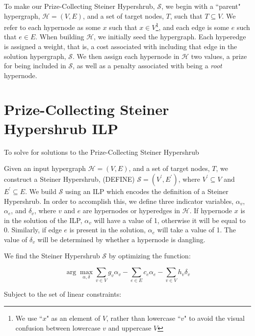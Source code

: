 \documentclass[12pt,twoside]{reedthesis}
\theoremstyle{definition}
\newcommand{\argmax}{\arg\!\max}
\begin{document}
To make our Prize-Collecting Steiner Hypershrub, $\mathcal{S}$, we begin with a ``parent" hypergraph, $\mathcal{H} = (V,E)$, and a set of target nodes, $T$, such that $T \subseteq V$.  We refer to each hypernode as some $x$ such that $x \in V$\footnote{We use ``$x$" as an element of $V$, rather than lowercase ``$v$" to avoid the visual confusion between lowercase $v$ and uppercase $V$}, and each edge is some $e$ such that $e \in E$.  When building $\mathcal{H}$, we initially seed the hypergraph.  Each hyperedge is assigned a weight, that is, a cost associated with including that edge in the solution hypergraph, $\mathcal{S}$.  We then assign each hypernode in $\mathcal{H}$ two values, a prize for being included in $\mathcal{S}$, as well as a penalty associated with being a \textit{root} hypernode.\par
\section{Prize-Collecting Steiner Hypershrub ILP}

To solve for solutions to the Prize-Collecting Steiner Hypershrub

Given an input hypergraph $\mathcal{H}=(V,E)$, and a set of target nodes, $T$, we construct a Steiner Hypershrub, (DEFINE) $\mathcal{S}= (V^\prime,E^\prime)$, where $V^\prime \subseteq V$ and $E^\prime \subseteq E$.  We build $\mathcal{S}$ using an ILP which encodes the definition of a Steiner Hypershrub.  In order to accomplish this, we define three indicator variables, $\alpha_v$, $\alpha_e$, and $\delta_v$, where $v$ and $e$ are hypernodes or hyperedges in $\mathcal{H}$.  If hypernode $x$ is in the solution of the ILP, $\alpha_v$ will have a value of 1, otherwise it will be equal to 0.  Similarly, if edge $e$ is present in the solution, $\alpha_e$ will take a value of 1. The value of $\delta_v$ will be determined by whether a hypernode is dangling.\par

We find the Steiner Hypershrub $\mathcal{S}$ by optimizing the function:

\begin{equation} \label{eq:ilpsum}
 \argmax_{\alpha, \delta} \sum_{v \in V} g_v \alpha_v - \sum_{e \in E} c_e \alpha_e - \sum_{v \in V} h_v \delta_v
\end{equation}

Subject to the set of linear constraints:
\end{document}
